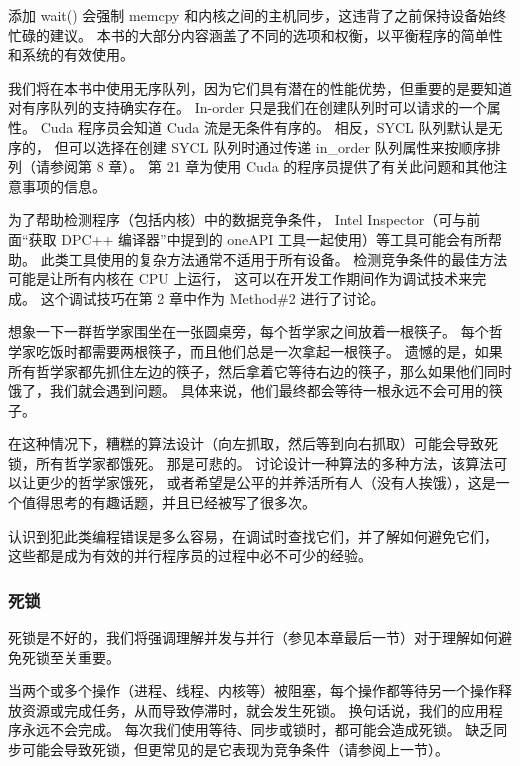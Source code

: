 添加 wait() 会强制 memcpy 和内核之间的主机同步，这违背了之前保持设备始终忙碌的建议。 
本书的大部分内容涵盖了不同的选项和权衡，以平衡程序的简单性和系统的有效使用。

\begin{remark}
	我们将在本书中使用无序队列，因为它们具有潜在的性能优势，但重要的是要知道对有序队列的支持确实存在。 
	In-order 只是我们在创建队列时可以请求的一个属性。 Cuda 程序员会知道 Cuda 流是无条件有序的。 
	相反，SYCL 队列默认是无序的，
	但可以选择在创建 SYCL 队列时通过传递 in\_order 队列属性来按顺序排列（请参阅第 8 章）。 
	第 21 章为使用 Cuda 的程序员提供了有关此问题和其他注意事项的信息。
\end{remark}

为了帮助检测程序（包括内核）中的数据竞争条件，
Intel Inspector（可与前面“获取 DPC++ 编译器”中提到的 oneAPI 工具一起使用）等工具可能会有所帮助。 
此类工具使用的复杂方法通常不适用于所有设备。 检测竞争条件的最佳方法可能是让所有内核在 CPU 上运行，
这可以在开发工作期间作为调试技术来完成。 这个调试技巧在第 2 章中作为 Method\#2 进行了讨论。

\begin{remark}
想象一下一群哲学家围坐在一张圆桌旁，每个哲学家之间放着一根筷子。 
每个哲学家吃饭时都需要两根筷子，而且他们总是一次拿起一根筷子。 
遗憾的是，如果所有哲学家都先抓住左边的筷子，然后拿着它等待右边的筷子，那么如果他们同时饿了，我们就会遇到问题。 
具体来说，他们最终都会等待一根永远不会可用的筷子。

在这种情况下，糟糕的算法设计（向左抓取，然后等到向右抓取）可能会导致死锁，所有哲学家都饿死。 
那是可悲的。 讨论设计一种算法的多种方法，该算法可以让更少的哲学家饿死，
或者希望是公平的并养活所有人（没有人挨饿），这是一个值得思考的有趣话题，并且已经被写了很多次。

认识到犯此类编程错误是多么容易，在调试时查找它们，并了解如何避免它们，
这些都是成为有效的并行程序员的过程中必不可少的经验。
\end{remark}

\subsubsection{死锁}
死锁是不好的，我们将强调理解并发与并行（参见本章最后一节）对于理解如何避免死锁至关重要。

当两个或多个操作（进程、线程、内核等）被阻塞，每个操作都等待另一个操作释放资源或完成任务，从而导致停滞时，就会发生死锁。 
换句话说，我们的应用程序永远不会完成。 每次我们使用等待、同步或锁时，都可能会造成死锁。 
缺乏同步可能会导致死锁，但更常见的是它表现为竞争条件（请参阅上一节）。

